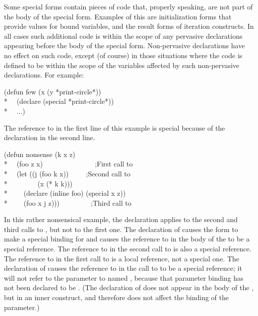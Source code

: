 \begin{defspec}
Some special forms contain pieces of code that, properly speaking,
are not part of the body of the special form.  Examples of this
are initialization forms that provide values for bound variables,
and the result forms of iteration constructs.
In all cases such additional code is within the scope of any pervasive
declarations appearing before the body of the special form.
Non-pervasive declarations have no effect on such code, except (of course)
in those situations where the code is defined to be within the scope
of the variables affected by such non-pervasive declarations.
For example:
\begin{lisp}
(defun few (x  (y *print-circle*)) \\*
~~(declare (special *print-circle*)) \\*
~~...)
\end{lisp}
The reference to  in the first line of this example is special
because of the declaration in the second line.
\begin{lisp}
(defun nonsense (k x z) \\*
~~(foo z x)~~~~~~~~~~~~~~~;{\rm First call to } \\*
~~(let ((j (foo k x))~~~~~;{\rm Second call to } \\*
~~~~~~~~(x (* k k))) \\*
~~~~(declare (inline foo) (special x z)) \\*
~~~~(foo x j z)))~~~~~~~~~;{\rm Third call to }
\end{lisp}
In this rather nonsensical example,
the  declaration applies to the
second and third calls to , but not to the first one.
The  declaration of  causes the  form
to make a special binding for  and causes the reference to 
in the body of the  to be a special reference.
The reference to  in the second call to  is also a special
reference.
The reference to  in the first call to  is a local
reference, not a special one.  The  declaration of 
causes the reference to  in the call
to  to be a special reference; it will not
refer to the parameter to  named , because that
parameter binding has not been declared to be .
(The  declaration of  does not appear in the body
of the , but in an inner construct, and therefore does not
affect the binding of the parameter.)


\end{defspec}
